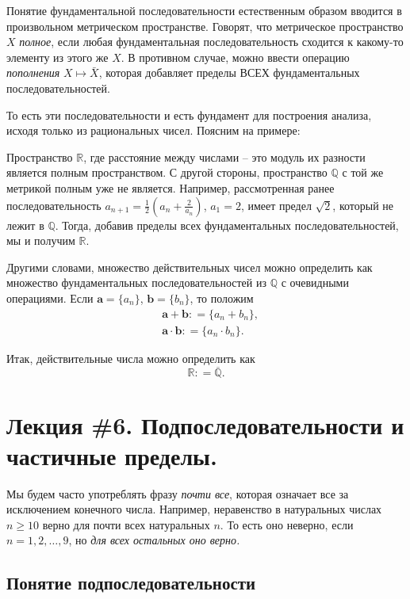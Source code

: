 Понятие фундаментальной последовательности естественным образом вводится в произвольном метрическом пространстве. Говорят, что метрическое пространство $X$ \textit{полное}, если любая фундаментальная последовательность сходится к какому-то элементу из этого же $X$. В противном случае, можно ввести операцию \textit{пополнения} $X \mapsto \bar X$, которая добавляет пределы ВСЕХ фундаментальных последовательностей.

То есть эти последовательности и есть фундамент для построения анализа, исходя только из рациональных чисел. Поясним на примере:

Пространство $\mathbb{R}$, где расстояние между числами -- это модуль их разности является полным пространством. С другой стороны, пространство $\mathbb{Q}$ с той же метрикой полным уже не является. Например, рассмотренная ранее последовательность $a_{n+1} = \frac{1}{2}\left( a_n + \frac{2}{a_n} \right)$, $a_1 =2$, имеет предел $\sqrt{2}$, который не лежит в $\mathbb{Q}$. Тогда, добавив пределы всех фундаментальных последовательностей, мы и получим $\mathbb{R}$.

Другими словами, множество действительных чисел можно определить как множество фундаментальных последовательностей из $\mathbb{Q}$ с очевидными операциями. Если $\mathbf{a} = \{a_n\}$, $\mathbf{b} = \{b_n\}$, то положим
\begin{align*}
    & \mathbf{a} + \mathbf{b}: = \{a_n + b_n\}, \\
    & \mathbf{a} \cdot \mathbf{b}: = \{a_n \cdot b_n\}.
\end{align*}

Итак, действительные числа можно определить как
{\Huge
 \[
  \boxed{
   \boxed{
  \mathbb{R}: =  \overline{\mathbb{Q}}.
  }
  }
\]
}


\section{Лекция \#6. Подпоследовательности и частичные пределы.}

Мы будем часто употреблять фразу \textit{почти все}\label{almost_all}, которая означает все за исключением конечного числа. Например, неравенство в натуральных числах $n\ge 10$ верно для почти всех натуральных $n$. То есть оно неверно, если $n=1,2,\ldots,9$, но \textit{для всех остальных оно верно.}

\subsection{Понятие подпоследовательности}


